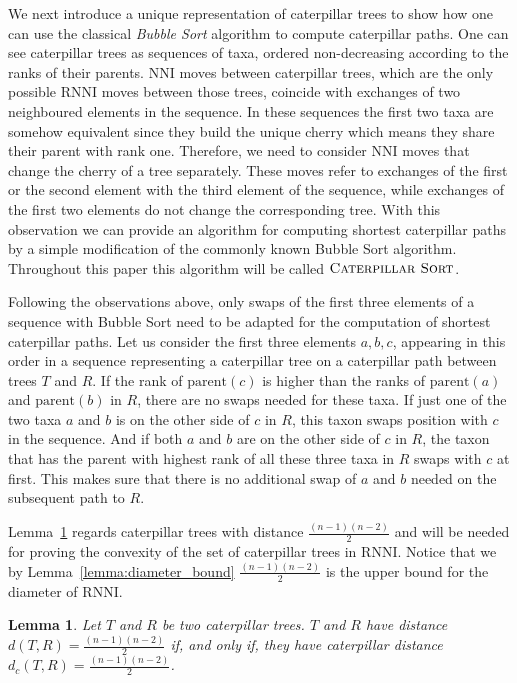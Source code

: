 \documentclass{amsart}
\newcommand{\parent}{\mathrm{parent}}
\newcommand{\nni}{\mathrm{NNI}}
\newcommand{\rnni}{\mathrm{RNNI}}
\newcommand{\csort}{\textsc{Caterpillar Sort}}
\newtheorem{lemma}[definition]{Lemma}
\begin{document}
We next introduce a unique representation of caterpillar trees to show how one can use the classical \emph{Bubble Sort} algorithm \autocite{Knuth1997-pi} to compute caterpillar paths.
One can see caterpillar trees as sequences of taxa, ordered non-decreasing according to the ranks of their parents.
$\nni$ moves between caterpillar trees, which are the only possible $\rnni$ moves between those trees, coincide with exchanges of two neighboured elements in the sequence.
In these sequences the first two taxa are somehow equivalent since they build the unique cherry which means they share their parent with rank one.
Therefore, we need to consider $\nni$ moves that change the cherry of a tree separately.
These moves refer to exchanges of the first or the second element with the third element of the sequence, while exchanges of the first two elements do not change the corresponding tree.
With this observation we can provide an algorithm for computing shortest caterpillar paths by a simple modification of the commonly known Bubble Sort algorithm.
Throughout this paper this algorithm will be called $\csort$.

Following the observations above, only swaps of the first three elements of a sequence with Bubble Sort need to be adapted for the computation of shortest caterpillar paths.
Let us consider the first three elements $a,b,c$, appearing in this order in a sequence representing a caterpillar tree on a caterpillar path between trees $T$ and $R$.
If the rank of $\parent(c)$ is higher than the ranks of $\parent(a)$ and $\parent(b)$ in $R$, there are no swaps needed for these taxa.
If just one of the two taxa $a$ and $b$ is on the other side of $c$ in $R$, this taxon swaps position with $c$ in the sequence.
And if both $a$ and $b$ are on the other side of $c$ in $R$, the taxon that has the parent with highest rank of all these three taxa in $R$ swaps with $c$ at first.
This makes sure that there is no additional swap of $a$ and $b$ needed on the subsequent path to $R$.

Lemma~\ref{lemma:caterpillar_dist=diameter} regards caterpillar trees with distance $\frac{(n-1)(n-2)}{2}$ and will be needed for proving the convexity of the set of caterpillar trees in $\rnni$.
Notice that we by Lemma~\ref{lemma:diameter_bound} $\frac{(n-1)(n-2)}{2}$ is the upper bound for the diameter of $\rnni$.

\begin{lemma}
    Let $T$ and $R$ be two caterpillar trees.
    $T$ and $R$ have distance $d(T,R) = \frac{(n-1)(n-2)}{2}$ if, and only if, they have caterpillar distance $d_c(T,R) = \frac{(n-1)(n-2)}{2}$.
    \label{lemma:caterpillar_dist=diameter}
\end{lemma}
\end{document}
